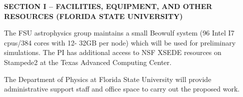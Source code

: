 \documentclass[11pt]{article}
\begin{document}
\vspace{-6mm}
\begin{center} 
\bfseries\uppercase{Section I -- Facilities, Equipment, and Other
  Resources (Florida State University)}
\end{center}

The FSU astrophysics group maintains a small Beowulf system (96 Intel I7 cpus/384 cores with 12-
32GB per node) which will be used for preliminary simulations. 
The PI has additional access to NSF XSEDE resources
on Stampede2 at the Texas Advanced Computing Center.  

The Department of Physics at Florida State University will provide
administrative support staff and  office space to carry out the proposed work.
\end{document}
